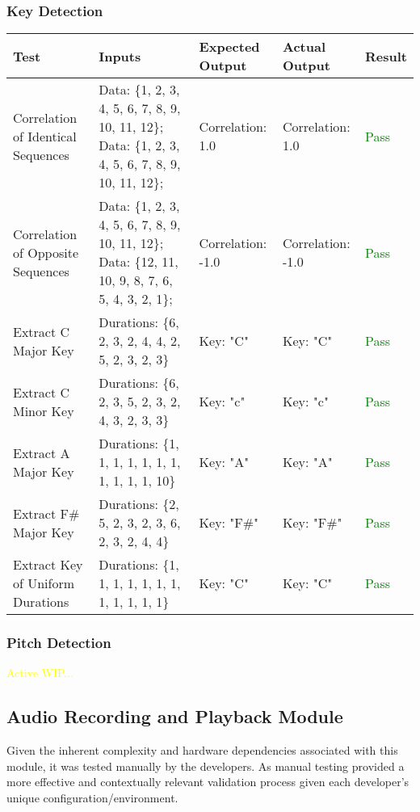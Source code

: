 \documentclass[12pt, titlepage]{article}
\begin{document}
\subsubsection{Key Detection}
\begin{longtable}{|L{3cm}|L{3cm}|L{2.5cm}|L{2.5cm}|l|}
  \hline
  \textbf{Test} & \textbf{Inputs} & \textbf{Expected Output} & \textbf{Actual Output} & \textbf{Result} \\
  \hline
  Correlation of Identical Sequences &
    Data: \{1, 2, 3, 4, 5, 6, 7, 8, 9, 10, 11, 12\}; \newline
    Data: \{1, 2, 3, 4, 5, 6, 7, 8, 9, 10, 11, 12\}; &
    Correlation: 1.0 &
    Correlation: 1.0 &
    \textcolor{green}{Pass} \\
  \hline
  Correlation of Opposite Sequences &
    Data: \{1, 2, 3, 4, 5, 6, 7, 8, 9, 10, 11, 12\}; \newline
    Data: \{12, 11, 10, 9, 8, 7, 6, 5, 4, 3, 2, 1\}; &
    Correlation: -1.0 &
    Correlation: -1.0 &
    \textcolor{green}{Pass} \\
  \hline
  Extract C Major Key &
    Durations: \{6, 2, 3, 2, 4, 4, 2, 5, 2, 3, 2, 3\} &
    Key: "C" &
    Key: "C" &
    \textcolor{green}{Pass} \\
  \hline
  Extract C Minor Key &
    Durations: \{6, 2, 3, 5, 2, 3, 2, 4, 3, 2, 3, 3\} &
    Key: "c" &
    Key: "c" &
    \textcolor{green}{Pass} \\
  \hline
  Extract A Major Key &
    Durations: \{1, 1, 1, 1, 1, 1, 1, 1, 1, 1, 1, 10\} &
    Key: "A" &
    Key: "A" &
    \textcolor{green}{Pass} \\
  \hline
  Extract F\# Major Key &
    Durations: \{2, 5, 2, 3, 2, 3, 6, 2, 3, 2, 4, 4\} &
    Key: "F\#" &
    Key: "F\#" &
    \textcolor{green}{Pass} \\
  \hline
  Extract Key of Uniform Durations &
    Durations: \{1, 1, 1, 1, 1, 1, 1, 1, 1, 1, 1, 1\} &
    Key: "C" &
    Key: "C" &
    \textcolor{green}{Pass} \\
  \hline
\end{longtable}

\subsubsection{Pitch Detection}
\textcolor{yellow}{Active WIP...}

\subsection{Audio Recording and Playback Module}
Given the inherent complexity and hardware dependencies associated with this module, it 
was tested manually by the developers. As manual testing provided a more effective and contextually 
relevant validation process given each developer's unique configuration/environment.
\end{document}
